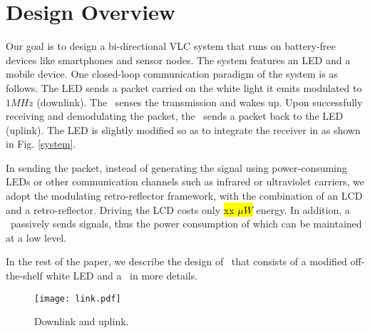 \section{Design Overview}


Our goal is to design a bi-directional VLC system that runs on battery-free devices like smartphones and sensor nodes. The system features an LED and a mobile device. One closed-loop communication paradigm of the system is as follows. The LED sends a packet carried on the white light it emits modulated to $1MHz$ (downlink). The \vitag\ senses the transmission and wakes up. Upon successfully receiving and demodulating the packet, the \vitag\ sends a packet back to the LED (uplink). The LED is slightly modified so as to integrate the receiver in as shown in Fig. \ref{system}.

In sending the packet, instead of generating the signal using power-consuming LEDs or other communication channels such as infrared or ultraviolet carriers, we adopt the modulating retro-reflector framework, with the combination of an LCD and a retro-reflector. Driving the LCD costs only \hl{xx $\mu W$} energy. In addition, a \vitag\ passively sends signals, thus the power consumption of which can be maintained at a low level. 


In the rest of the paper, we describe the design of \retro\ that consists of a modified off-the-shelf white LED and a \vitag\ in more details.


\begin{figure}[th]
   \centering
   \texttt{[image: link.pdf]}
   \caption{Downlink and uplink.}
   \label{fig:link}
   \vskip -3mm
\end{figure}

